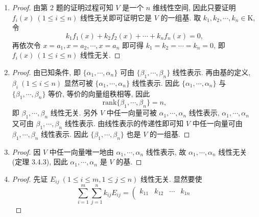 \begin{enumerate}
\begin{proof}
            用同样的方法可以证明 $\{1, x+1, \cdots, (x+1)^n\}$ 也是线性无关的. 另一方面 $\{1, x, \cdots, x^n\}$ 中任意向量可由 $\{1, x+1, \cdots, (x+1)^n\}$ 线性表示,
            由线性表示的传递性可知任一次数不超过 $n$ 的多项式可由 $\{1, x+1, \cdots, (x+1)^n\}$ 线性表示.
        \end{proof}
    \item %
        \begin{proof}
            由第 2 题的证明过程可知 $V$ 是一个 $n$ 维线性空间, 因此只要证明 $f_i(x)\ (1\leq i\leq n)$ 线性无关即可证明它是 $V$ 的一组基.
            取 $k_1, k_2, \cdots, k_n \in \mathrm{K}$, 令
            \[
                k_1f_1(x) + k_2f_2(x) + \cdots + k_nf_n(x) = 0,    
            \]
            再依次令 $x = a_1, x=a_2, \cdots, x=a_n$ 即可得 $k_1 = k_2 = \cdots = k_n = 0$, 即 $f_i(x)\ (1\leq i\leq n)$ 线性无关.
        \end{proof}
    \item %
        \begin{proof}
            由已知条件, 即 $\{\alpha_1, \cdots, \alpha_n\}$ 可由 $\{\beta_1, \cdots, \beta_n\}$ 线性表示. 再由基的定义, $\beta_i\ (1\leq i \leq n)$ 显然可被 $\{\alpha_1, \cdots, \alpha_n\}$ 线性表示.
            因此 $\{\alpha_1, \cdots, \alpha_n\}$ 与 $\{\beta_1, \cdots, \beta_n\}$ 等价, 等价的向量组秩相等, 因此
            \[
                \mathrm{rank}\{\beta_1, \cdots, \beta_n\} = n,
            \]
            即 $\beta_1, \cdots, \beta_n$ 线性无关. 另外 $V$ 中任一向量可被 $\alpha_1, \cdots, \alpha_n$ 线性表示, $\alpha_1, \cdots, \alpha_n$ 又可由 $\beta_1, \cdots, \beta_n$ 线性表示.
            由线性表示的传递性即可知 $V$ 中任一向量可由 $\beta_1, \cdots, \beta_n$ 线性表示. 因此 $\{\beta_1, \cdots, \beta_n\}$ 也是 $V$ 的一组基.
        \end{proof}
    \item %
        \begin{proof}
            因 $V$ 中任一向量唯一地由 $\alpha_1, \cdots, \alpha_n$ 线性表示, 故 $\alpha_1, \cdots, \alpha_n$ 线性无关 (定理 3.4.3), 因此 $\alpha_1, \cdots, \alpha_n$ 是 $V$ 的基.
        \end{proof}
    \item %
        \begin{proof}
            先证 $E_{ij}\ (1 \leq i \leq m, 1 \leq j \leq n)$ 线性无关. 显然要使
            \[
                \sum_{i=1}^m\sum_{j=1}^nk_{ij}E_{ij} =
                \left(
                    \begin{array}{cccc}
                        k_{11} & k_{12} & \cdots & k_{1n} \\

\end{array}\]
\end{proof}
\end{enumerate}
